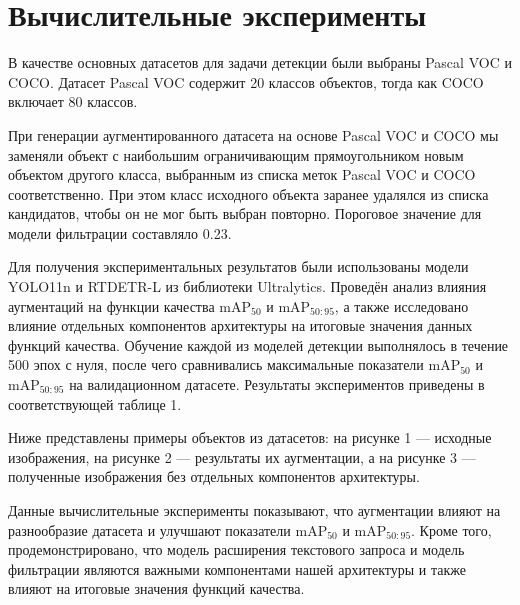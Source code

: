 \section{Вычислительные эксперименты}

В качестве основных датасетов для задачи детекции были выбраны Pascal VOC\cite{pascal-voc-2007} и COCO\cite{DBLP:journals/corr/LinMBHPRDZ14}. Датасет Pascal VOC содержит 20 классов объектов, тогда как COCO включает 80 классов. 

При генерации аугментированного датасета на основе Pascal VOC и COCO мы заменяли объект с наибольшим ограничивающим прямоугольником новым объектом другого класса, выбранным из списка меток Pascal VOC и COCO соответственно. При этом класс исходного объекта заранее удалялся из списка кандидатов, чтобы он не мог быть выбран повторно. Пороговое значение для модели фильтрации составляло 0.23.

Для получения экспериментальных результатов были использованы модели YOLO11n и RTDETR-L из библиотеки Ultralytics. Проведён анализ влияния аугментаций на функции качества $\text{mAP}_{50}$ и $\text{mAP}_{50:95}$, а также исследовано влияние отдельных компонентов архитектуры на итоговые значения данных функций качества. Обучение каждой из моделей детекции выполнялось в течение 500 эпох с нуля, после чего сравнивались максимальные показатели $\text{mAP}_{50}$ и $\text{mAP}_{50:95}$ на валидационном датасете. Результаты экспериментов приведены в соответствующей таблице 1. 

Ниже представлены примеры объектов из датасетов: на рисунке 1 — исходные изображения, на рисунке 2 — результаты их аугментации, а на рисунке 3 — полученные изображения без отдельных компонентов архитектуры. 

Данные вычислительные эксперименты показывают, что аугментации влияют на разнообразие датасета и улучшают показатели $\text{mAP}_{50}$ и $\text{mAP}_{50:95}$. Кроме того, продемонстрировано, что модель расширения текстового запроса и модель фильтрации являются важными компонентами нашей архитектуры и также влияют на итоговые значения функций качества.




